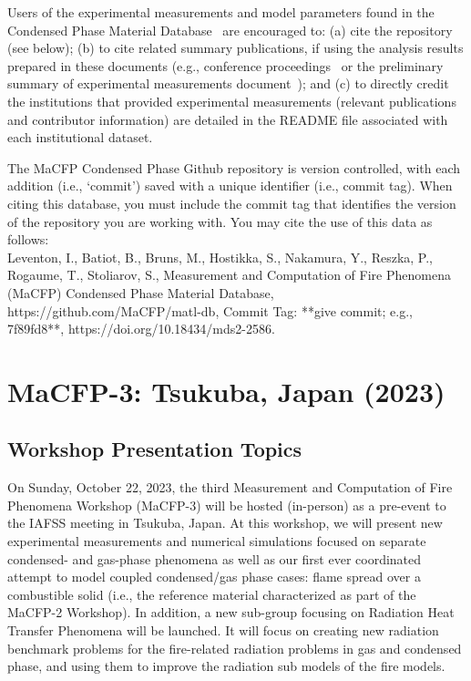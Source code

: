 \documentclass[12pt]{article}
\begin{document}
Users of the experimental measurements and model parameters found in the Condensed Phase Material Database~\cite{MaCFP-cond-db} are encouraged to: (a) cite the repository (see below); (b) to cite related summary publications, if using the analysis results prepared in these documents (e.g., conference proceedings~\cite{brown2018proceedings} or the preliminary summary of experimental measurements document~\cite{MaCFP-2_Prelim_Exp}); and (c) to directly credit the institutions that provided experimental measurements (relevant publications and contributor information) are detailed in the README file associated with each institutional dataset. 

The MaCFP Condensed Phase Github repository is version controlled, with each addition (i.e., `commit') saved with a unique identifier (i.e., commit tag). When citing this database, you must include the commit tag that identifies the version of the repository you are working with. You may cite the use of this data as follows:\\ 
Leventon, I., Batiot, B., Bruns, M., Hostikka, S., Nakamura, Y., Reszka, P., Rogaume, T., Stoliarov, S., Measurement and Computation of Fire Phenomena (MaCFP) Condensed Phase Material Database, https://github.com/MaCFP/matl-db, Commit Tag: **give commit; e.g., 7f89fd8**, https://doi.org/10.18434/mds2-2586.

\clearpage
\section{MaCFP-3: Tsukuba, Japan (2023)}
\label{Sec:MaCFP-3}
\subsection{Workshop Presentation Topics}
\label{Sec:MaCFP-3 Target Cases}
On Sunday, October 22, 2023, the third Measurement and Computation of Fire Phenomena Workshop (MaCFP-3) will be hosted (in-person) as a pre-event to the IAFSS meeting in Tsukuba, Japan. At this workshop, we will present new experimental measurements and numerical simulations focused on separate condensed- and gas-phase phenomena as well as our first ever coordinated attempt to model coupled condensed/gas phase cases: flame spread over a combustible solid (i.e., the reference material characterized as part of the MaCFP-2 Workshop). In addition, a new sub-group focusing on Radiation Heat Transfer Phenomena will be launched. It will focus on creating new radiation benchmark problems for the fire-related radiation problems in gas and condensed phase, and using them to improve the radiation sub models of the fire models.
\end{document}
